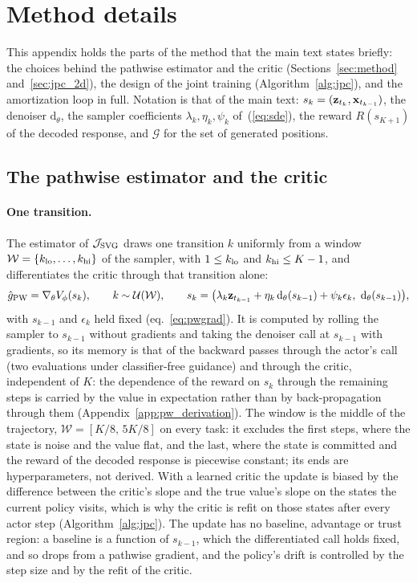 \section{Method details}
\label{app:method_details}
This appendix holds the parts of the method that the main text states briefly: the choices behind the pathwise estimator and the critic (Sections~\ref{sec:method} and~\ref{sec:jpc_2d}), the design of the joint training (Algorithm~\ref{alg:jpc}), and the amortization loop in full. Notation is that of the main text: $s_k=({\mathbf{z}}_{t_k},{\mathbf{x}}_{t_{k-1}})$, the denoiser $\mathrm d_\theta$, the sampler coefficients $\lambda_k,\eta_k,\psi_k$ of~(\ref{eq:sde}), the reward $R(s_{K+1})$ of the decoded response, and $\mathcal G$ for the set of generated positions.

\subsection{The pathwise estimator and the critic}
\label{app:pw_details}
\paragraph{One transition.}
The estimator of $\mathcal J_{\rm SVG}$ draws one transition $k$ uniformly from a window $\mathcal W=\{k_{\rm lo},\dots,k_{\rm hi}\}$ of the sampler, with $1\le k_{\rm lo}$ and $k_{\rm hi}\le K-1$, and differentiates the critic through that transition alone:
\begin{equation*}
\hat g_{\rm PW}=\nabla_\theta V_\phi(s_k),\qquad k\sim\mathcal U(\mathcal W),\qquad s_k=\big(\lambda_k{\mathbf{z}}_{t_{k-1}}+\eta_k\,\mathrm d_\theta(s_{k-1})+\psi_k\epsilon_k,\ \mathrm d_\theta(s_{k-1})\big),
\end{equation*}
with $s_{k-1}$ and $\epsilon_k$ held fixed (eq.~\ref{eq:pwgrad}). It is computed by rolling the sampler to $s_{k-1}$ without gradients and taking the denoiser call at $s_{k-1}$ with gradients, so its memory is that of the backward passes through the actor's call (two evaluations under classifier-free guidance) and through the critic, independent of $K$: the dependence of the reward on $s_k$ through the remaining steps is carried by the value in expectation rather than by back-propagation through them (Appendix~\ref{app:pw_derivation}). The window is the middle of the trajectory, $\mathcal W=[K/8,\,5K/8]$ on every task: it excludes the first steps, where the state is noise and the value flat, and the last, where the state is committed and the reward of the decoded response is piecewise constant; its ends are hyperparameters, not derived. With a learned critic the update is biased by the difference between the critic's slope and the true value's slope on the states the current policy visits, which is why the critic is refit on those states after every actor step (Algorithm~\ref{alg:jpc}). The update has no baseline, advantage or trust region: a baseline is a function of $s_{k-1}$, which the differentiated call holds fixed, and so drops from a pathwise gradient, and the policy's drift is controlled by the step size and by the refit of the critic.

